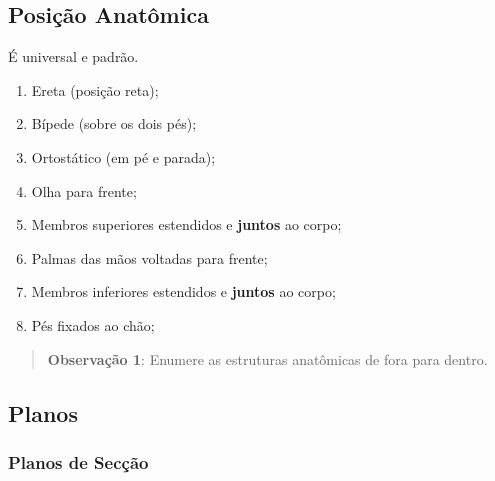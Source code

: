 \documentclass[
]{book}
\providecommand{\tightlist}{%
  \setlength{\itemsep}{0pt}\setlength{\parskip}{0pt}}
\begin{document}
\hypertarget{posiuxe7uxe3o-anatuxf4mica}{%
\subsection{Posição Anatômica}\label{posiuxe7uxe3o-anatuxf4mica}}

É universal e padrão.

\begin{enumerate}
\def\labelenumi{\arabic{enumi}.}
\tightlist
\item
  Ereta (posição reta);
\item
  Bípede (sobre os dois pés);
\item
  Ortostático (em pé e parada);
\item
  Olha para frente;
\item
  Membros superiores estendidos e \textbf{juntos} ao corpo;
\item
  Palmas das mãos voltadas para frente;
\item
  Membros inferiores estendidos e \textbf{juntos} ao corpo;
\item
  Pés fixados ao chão;
\end{enumerate}

\begin{quote}
\textbf{Observação 1}: Enumere as estruturas anatômicas de fora para dentro.
\end{quote}

\hypertarget{planos}{%
\subsection{Planos}\label{planos}}

\hypertarget{planos-de-secuxe7uxe3o}{%
\subsubsection*{Planos de Secção}\label{planos-de-secuxe7uxe3o}}
\end{document}
